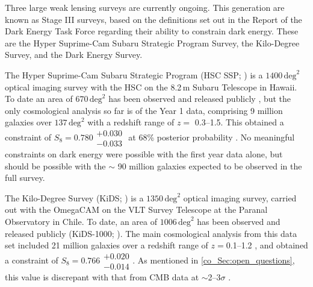 Three large weak lensing surveys are currently ongoing. This generation are known as Stage III surveys, based on the definitions set out in the Report of the Dark Energy Task Force \citep{Albrecht2006} regarding their ability to constrain dark energy. These are the Hyper Suprime-Cam Subaru Strategic Program Survey, the Kilo-Degree Survey, and the Dark Energy Survey.

The Hyper Suprime-Cam Subaru Strategic Program (HSC SSP; \citealt{Aihara2018}) is a $1400\,\text{deg}^2$ optical imaging survey with the HSC \citep{Miyazaki2012} on the 8.2\,m Subaru Telescope in Hawaii. To date an area of $670\,\text{deg}^2$ has been observed and released publicly \citep{Aihara2021}, but the only cosmological analysis so far is of the Year 1 data, comprising 9 million galaxies over $137\,\text{deg}^2$ with a redshift range of $z =$ 0.3--1.5. This obtained a constraint of $S_8 = 0.780\substack{+0.030 \\ -0.033}$ at 68\% posterior probability \citep{Hikage2019}. No meaningful constraints on dark energy were possible with the first year data alone, but should be possible with the $\sim$ 90 million galaxies expected to be observed in the full survey.

The Kilo-Degree Survey (KiDS; \citealt{DeJong2013}) is a $1350\,\text{deg}^2$ optical imaging survey, carried out with the OmegaCAM \citep{Kuijken2011} on the VLT Survey Telescope at the Paranal Observatory in Chile. To date, an area of $1006\,\text{deg}^2$ has been observed and released publicly (KiDS-1000; \citealt{Kuijken2019}). The main cosmological analysis from this data set included 21 million galaxies over a redshift range of $z = $0.1--1.2 \citep{Giblin2021}, and obtained a constraint of $S_8 = 0.766\substack{+0.020\\-0.014}$. As mentioned in \autoref{co_Sec:open_questions}, this value is discrepant with that from \Planck{} CMB data \citep{Planck2018VI} at $\sim$2--3$\sigma$ \citep{Heymans2021}.


